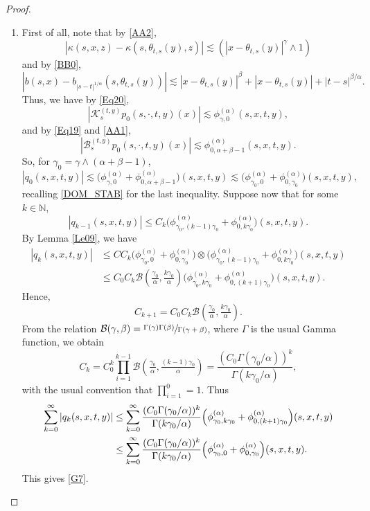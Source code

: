 \documentclass[JEP,XML,SOM,Unicode,published]{cedram}
\theoremstyle{plain}
\theoremstyle{definition}
\newcommand\cB{{\mathcal B}}
\newcommand\mN{\mathbb{N}}
\newcommand\1{{\mathbf{1}}}
\newcommand\sB{{\mathscr B}}
\newcommand\sK{{\mathscr K}}
\begin{document}
\skpt
\begin{proof}
\begin{enumerate}
\item\label{pf:Le31i}
First of all, note that by \eqref{AA2},
\begin{equation*}
|\kappa(s,x,z)-\kappa(s, \theta_{t,s}(y),z)|\lesssim (|x-\theta_{t,s}(y)|^{\gamma}\wedge 1)
\end{equation*}
and by \eqref{BB0},
\begin{equation*}
|b(s,x)-b_{|s-t|^{1/\alpha}}(s, \theta_{t,s}(y))|
\lesssim |x-\theta_{t,s}(y)|^\beta+|x-\theta_{t,s}(y)|+|t-s|^{\beta/\alpha}.
\end{equation*}
Thus, we have by \eqref{Eq20},
\begin{equation*}
|\sK^{(t,y)}_{s}p_0(s,\cdot,t,y)(x)|\lesssim \phi^{(\alpha)}_{\gamma,0}(s,x,t,y),
\end{equation*}
and by \eqref{Eq19} and \eqref{AA1},
\begin{equation*}
|\sB^{(t,y)}_{s} p_0(s,\cdot,t,y)(x)|\lesssim \phi^{(\alpha)}_{0,\alpha+\beta-1}(s,x,t,y).
\end{equation*}
So, for $\gamma_0=\gamma\wedge(\alpha+\beta-1)$,
\begin{equation*}
|q_0(s,x,t,y)|\lesssim\bigl(\phi^{(\alpha)}_{\gamma,0}+\phi^{(\alpha)}_{0,\alpha+\beta-1}\bigr)(s,x,t,y)
\lesssim\bigl(\phi^{(\alpha)}_{\gamma_0,0}+\phi^{(\alpha)}_{0,\gamma_0}\bigr)(s,x,t,y),
\end{equation*}
{recalling \eqref{DOM_STAB} for the last inequality.}
Suppose now that for some $k\in\mN$,
\[
|q_{k-1}(s,x,t,y)|\leq C_k\bigl(\phi^{(\alpha)}_{\gamma_0,(k-1)\gamma_0}+\phi^{(\alpha)}_{0,k\gamma_0}\bigr)(s,x,t,y).
\]
By Lemma \ref{Le09}, we have
\begin{align*}
|q_{k}(s,x,t,y)|
&\leq C C_k\bigl(\phi^{(\alpha)}_{\gamma_0,0}+\phi^{(\alpha)}_{0,\gamma_0}\bigr)\otimes
\bigl(\phi^{(\alpha)}_{\gamma_0,(k-1)\gamma_0}+\phi^{(\alpha)}_{0,k\gamma_0}\bigr)(s,x,t,y)
\\
&\leq C_0C_k\cB(\tfrac{\gamma_0}{\alpha},\tfrac{k\gamma_0}{\alpha})
\bigl(\phi^{(\alpha)}_{\gamma_0,k\gamma_0}+\phi^{(\alpha)}_{0,(k+1)\gamma_0}\bigr)(s,x,t,y).%
\end{align*}
Hence,
\[
C_{k+1}=C_0C_k\cB(\tfrac{\gamma_0}{\alpha},\tfrac{k\gamma_0}{\alpha}).
\]
From the relation $\cB(\gamma,\beta)=\sfrac{\Gamma(\gamma)\Gamma(\beta)}{\Gamma(\gamma+\beta)}$, where $\Gamma$
is the usual Gamma function, we obtain
\[
C_k=C^k_0\prod_{i=1}^{k-1}\cB(\tfrac{\gamma_0}{\alpha},\tfrac{(k-1)\gamma_0}{\alpha})
=\frac{(C_0\Gamma(\gamma_0/\alpha))^k}{\Gamma(k\gamma_0/\alpha)},
\]
with the usual convention that $\prod_{i=1}^{0}=1 $.
Thus
\begin{align*}
\sum_{k=0}^\infty |q_k(s,x,t,y)|
&\leq \sum_{k=0}^\infty\frac{(C_0\Gamma(\gamma_0/\alpha))^k}{\Gamma(k\gamma_0/\alpha)}
\Bigl(\phi^{(\alpha)}_{\gamma_0,k\gamma_0}+\phi^{(\alpha)}_{0,(k+1)\gamma_0}\Bigr)(s,x,t,y)
\\&\leq \sum_{k=0}^\infty\frac{(C_0\Gamma(\gamma_0/\alpha))^k}{\Gamma(k\gamma_0/\alpha)}
\Bigl(\phi^{(\alpha)}_{\gamma_0,0}+\phi^{(\alpha)}_{0,\gamma_0}\Bigr)(s,x,t,y).
\end{align*}
This gives \eqref{G7}.


\end{enumerate}
\end{proof}
\end{document}
